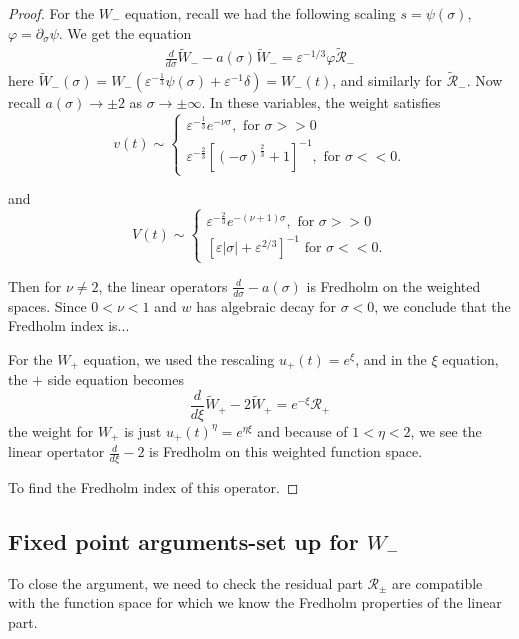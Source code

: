 \documentclass[letterpaper,11pt]{article}
\newcommand{\eps}{\varepsilon}
\numberwithin{equation}{section}
\theoremstyle{plain}
\begin{document}
\begin{itemize}
\begin{proof}
For the $W_-$ equation, recall we had the following scaling $s=\psi(\sigma)$, $\varphi = \partial_\sigma \psi$. We get the equation
\begin{align*}
\frac{d}{d\sigma} \tilde{W}_- -a(\sigma)\tilde{W}_- = \eps^{-1/3}\varphi \tilde{\mathcal{R}}_-
\end{align*}
here $\tilde{W}_-(\sigma) = W_-(\eps^{-\frac{1}{3}} \psi(\sigma)+\eps^{-1}\delta)=W_-(t)$, and similarly for $\tilde{\mathcal{R}}_-$. Now recall $a(\sigma) \to \pm 2 $ as $\sigma \to \pm \infty$. In these variables, the weight satisfies
\[
v(t) \sim \begin{cases}
 \eps^{-\frac{1}{3}} e^{-\nu \sigma},  \text{ for }\sigma >>0 \\
\eps^{-\frac{2}{3}}[(-\sigma)^{\frac{2}{3}}+1]^{-1}, \text{ for }\sigma << 0.
\end{cases}
\]

and 
\[
V(t) \sim \begin{cases}
 \eps^{-\frac{2}{3}} e^{-(\nu+1)\sigma},  \text{ for }\sigma >>0 \\
[\eps |\sigma|+\eps^{2/3}]^{-1} \text{ for }\sigma << 0.
\end{cases}
\]

Then for $\nu \neq 2$, the linear operators $\frac{d}{d\sigma} -a(\sigma)$ is Fredholm on the weighted spaces.  Since $0 < \nu < 1$ and $w$ has algebraic decay for $\sigma<0$, we conclude that the Fredholm index is...

For the $W_+$ equation, we used the rescaling $u_+(t)  = e^\xi$, and in the $\xi$ equation, the $+$ side equation becomes
\[
\frac{d}{d\xi}\tilde{W}_+ -2\tilde{W}_+ = e^{-\xi}\mathcal{R}_+
\]
the weight for $W_+$ is just $u_+(t)^{\eta}=e^{\eta \xi}$ and because of $1<\eta<2$, we see the linear opertator $\frac{d}{d\xi}-2$ is Fredholm on this weighted function space.

To find the Fredholm index of this operator.
\end{proof}

\pagebreak

\subsection{Fixed point arguments-set up for \texorpdfstring{$W_-$}{Wminus}}
To close the argument, we need to check the residual part $\mathcal{R}_{\pm}$ are compatible with the function space for which we know the Fredholm properties of the linear part.


\end{itemize}
\end{document}
